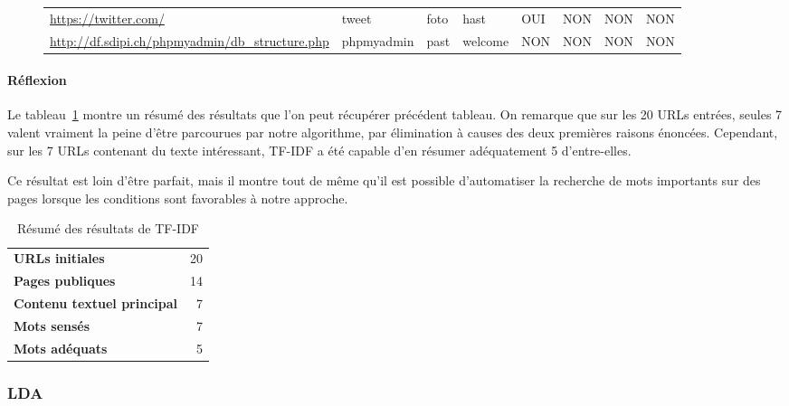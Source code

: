 \begin{figure}
\begin{tabular}{llllllll}
\scriptsize \url{https://twitter.com/}                                  & tweet           & foto                     & hast           & \cellcolor[HTML]{9AFF99}OUI & \cellcolor[HTML]{FFCCC9}NON & \cellcolor[HTML]{FFCCC9}NON & \cellcolor[HTML]{FFCCC9}NON \\
\scriptsize \url{http://df.sdipi.ch/phpmyadmin/db\_structure.php}       & phpmyadmin      & past                     & welcome        & \cellcolor[HTML]{FFCCC9}NON & \cellcolor[HTML]{FFCCC9}NON & \cellcolor[HTML]{FFCCC9}NON & \cellcolor[HTML]{FFCCC9}NON \\ \hline
\end{tabular}
\end{figure}

			\paragraph{Réflexion}

				Le tableau~\ref{resultats-tfidf} montre un résumé des résultats que l'on peut récupérer précédent tableau. On remarque que sur les 20 URLs entrées, seules 7 valent vraiment la peine d'être parcourues par notre algorithme, par élimination à causes des deux premières raisons énoncées. Cependant, sur les 7 URLs contenant du texte intéressant, TF-IDF a été capable d'en résumer adéquatement 5 d'entre-elles.

				Ce résultat est loin d'être parfait, mais il montre tout de même qu'il est possible d'automatiser la recherche de mots importants sur des pages lorsque les conditions sont favorables à notre approche.

\FloatBarrier

				\begin{table}[h]
\centering
\caption{Résumé des résultats de TF-IDF}
\label{resultats-tfidf}
\begin{tabular}{lr}
\textbf{URLs initiales}            & 20 \\
\textbf{Pages publiques}           & 14 \\
\textbf{Contenu textuel principal} & 7  \\
\textbf{Mots sensés}               & 7  \\
\textbf{Mots adéquats}             & 5 
\end{tabular}
\end{table}

		\subsubsection{LDA}

